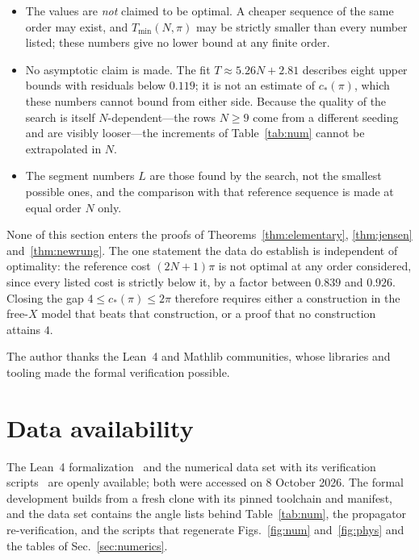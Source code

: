 \documentclass[%
  aps,
  pra,
  preprint,
  superscriptaddress,
  amsmath,amssymb,
  nofootinbib,
  floatfix,
]{revtex4-2}
\theoremstyle{definition}
\theoremstyle{remark}
\newcommand{\cstar}{c_*}
\begin{document}
\begin{itemize}[leftmargin=1.4em,itemsep=0.15em,topsep=0.25em]
\item The values are \emph{not} claimed to be optimal. A cheaper sequence of the same order may
  exist, and $T_{\min}(N,\pi)$ may be strictly smaller than every number listed; these numbers give no lower bound at any finite order.
\item No asymptotic claim is made. The fit $T\approx5.26N+2.81$ describes eight upper bounds with
  residuals below $0.119$; it is not an estimate of $\cstar(\pi)$, which these numbers cannot bound
  from either side. Because the quality of the search is itself $N$-dependent---the rows $N\ge9$
  come from a different seeding and are visibly looser---the increments of Table~\ref{tab:num}
  cannot be extrapolated in $N$.
\item The segment numbers $L$ are those found by the search, not the smallest possible ones, and
  the comparison with that reference sequence is made at equal order $N$ only.
\end{itemize}

None of this section enters the proofs of Theorems~\ref{thm:elementary}, \ref{thm:jensen}
and~\ref{thm:newrung}. The one statement the data do establish is independent of optimality: the
reference cost $(2N+1)\pi$ is not optimal at any order considered, since every listed cost is
strictly below it, by a factor between $0.839$ and $0.926$. Closing the gap
$4\le\cstar(\pi)\le2\pi$ therefore requires either a construction in the free-$X$ model that
beats that construction, or a proof that no construction attains $4$.





\begin{acknowledgments}
The author thanks the Lean~4 and Mathlib communities, whose libraries and tooling made the
formal verification possible.
\end{acknowledgments}

\section*{Data availability}
The Lean~4 formalization~\cite{LeanRepo} and the numerical data set with its verification
scripts~\cite{DataRepo} are openly available; both were accessed on 8 October 2026. The formal
development builds from a fresh clone with its pinned toolchain and manifest, and the data set
contains the angle lists behind Table~\ref{tab:num}, the propagator re-verification, and the
scripts that regenerate Figs.~\ref{fig:num} and~\ref{fig:phys} and the tables of
Sec.~\ref{sec:numerics}.
\end{document}
